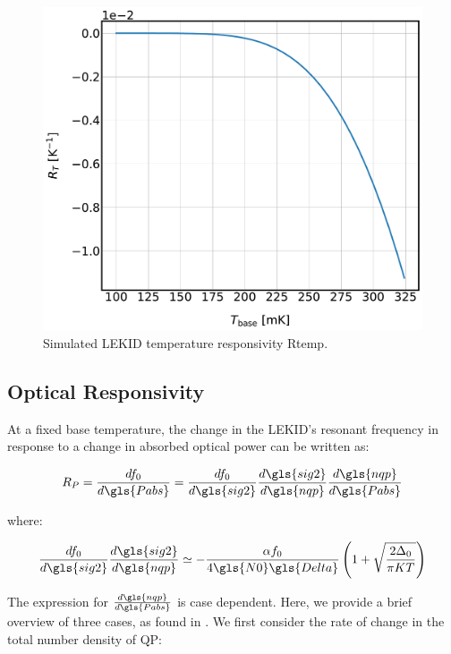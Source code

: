 \begin{figure}[!htbp]
\centering
\includegraphics[width=\textwidth]{figures/kid_model/dfdT}
\caption[Simulated LEKID temperature responsivity.]{Simulated LEKID temperature responsivity \gls{Rtemp}.}
\label{fig:dfdT}
\end{figure}

\subsection{Optical Responsivity}

At a fixed base temperature, the change in the LEKID's resonant frequency in response to a change in absorbed optical power can be written as:

\begin{equation}
    R_{P} = \frac{df_{0}}{d\gls{Pabs}} = \frac{df_{0}}{d\gls{sig2}} \frac{d\gls{sig2}}{d\gls{nqp}} \frac{d\gls{nqp}}{d\gls{Pabs}}
\end{equation}

where:

\begin{equation}
  \frac{df_{0}}{d\gls{sig2}}\frac{d\gls{sig2}}{d\gls{nqp}} \simeq -\frac{\alpha f_{0}} {4\gls{N0}\gls{Delta}} \left( 1 + \sqrt{ \frac{2 \Delta_{0}}{\pi K T}} \right)
\end{equation}

The expression for $\frac{d\gls{nqp}}{d\gls{Pabs}}$ is case dependent. Here, we provide a brief overview of three cases, as found in \citet{mauskopf2018transition}. We first consider the rate of change in the total number density of QP\@:

